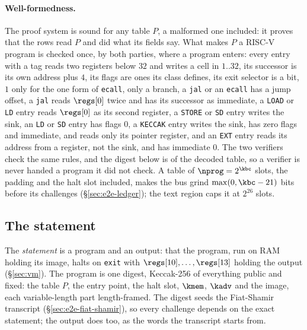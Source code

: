 \paragraph{Well-formedness.} The proof system is sound for any table $P$, a malformed one included: it proves that the rows read $P$ and did what its fields say. What makes $P$ a RISC-V program is checked once, by both parties, where a program enters: every entry with a tag reads two registers below $32$ and writes a cell in $1..32$, its successor is its own address plus $4$, its flags are ones its class defines, its exit selector is a bit, $1$ only for the one form of \texttt{ecall}, only a branch, a \texttt{jal} or an \texttt{ecall} has a jump offset, a \texttt{jal} reads $\regs[0]$ twice and has its successor as immediate, a \texttt{LOAD} or \texttt{LD} entry reads $\regs[0]$ as its second register, a \texttt{STORE} or \texttt{SD} entry writes the sink, an \texttt{LD} or \texttt{SD} entry has flags $0$, a \texttt{KECCAK} entry writes the sink, has zero flags and immediate, and reads only its pointer register, and an \texttt{EXT} entry reads its address from a register, not the sink, and has immediate $0$. The two verifiers check the same rules, and the digest below is of the decoded table, so a verifier is never handed a program it did not check. A table of $\nprog=2^{\kbc}$ slots, the padding and the halt slot included, makes the bus grind $\max(0,\kbc-21)$ bits before its challenges (\S\ref{sec:e2e-ledger}); the text region caps it at $2^{26}$ slots.

\subsection{The statement}\label{sec:e2e-pi}

The \emph{statement} is a program and an output: that the program, run on RAM holding its image, halts on \texttt{exit} with $\regs[10],\dots,\regs[13]$ holding the output (\S\ref{sec:vm}). The program is one digest, Keccak-256 of everything public and fixed: the table $P$, the entry point, the halt slot, $\kmem$, $\kadv$ and the image, each variable-length part length-framed. The digest seeds the Fiat-Shamir transcript (\S\ref{sec:e2e-fiat-shamir}), so every challenge depends on the exact statement; the output does too, as the words the transcript starts from.

